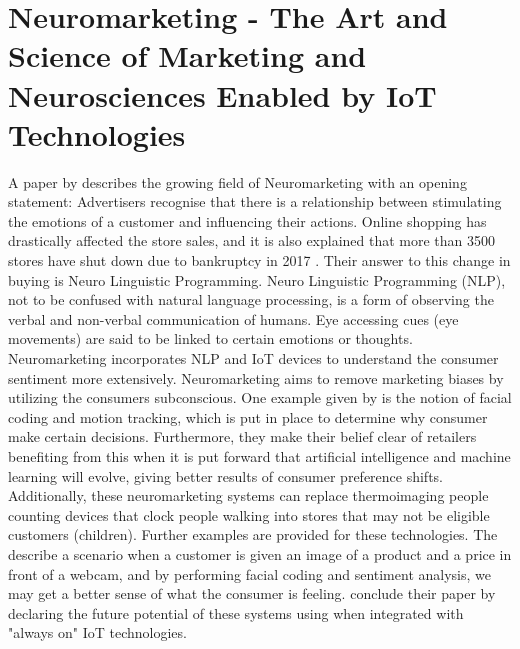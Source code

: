 \section{Neuromarketing - The Art and Science of Marketing and Neurosciences Enabled by IoT Technologies}
A paper by \citeauthor{arthmann} describes the growing field of Neuromarketing with an opening statement: Advertisers recognise that there is a relationship between stimulating the emotions of a customer and influencing their actions. Online shopping has drastically affected the store sales, and it is also explained that more than 3500 stores have shut down due to bankruptcy in 2017 \citep{arthmann}. Their answer to this change in buying is Neuro Linguistic Programming. Neuro Linguistic Programming (NLP), not to be confused with natural language processing, is a form of observing the verbal and non-verbal communication of humans. Eye accessing cues (eye movements) are said to be linked to certain emotions or thoughts. Neuromarketing incorporates NLP and IoT devices to understand the consumer sentiment more extensively. Neuromarketing aims to remove marketing biases by utilizing the consumers subconscious. One example given by \citeauthor{arthmann} is the notion of facial coding and motion tracking, which is put in place to determine why consumer make certain decisions. 
Furthermore, they make their belief clear of retailers benefiting from this when it is put forward that artificial intelligence and machine learning will evolve, giving better results of consumer preference shifts. Additionally, these neuromarketing systems can replace thermoimaging people counting devices that clock people walking into stores that may not be eligible customers (children). Further examples are provided for these technologies. The describe a scenario when a customer is given an image of a product and a price in front of a webcam, and by performing facial coding and sentiment analysis, we may get a better sense of what the consumer is feeling.
\citeauthor{arthmann} conclude their paper by declaring the future potential of these systems using when integrated with "always on" IoT technologies. 


